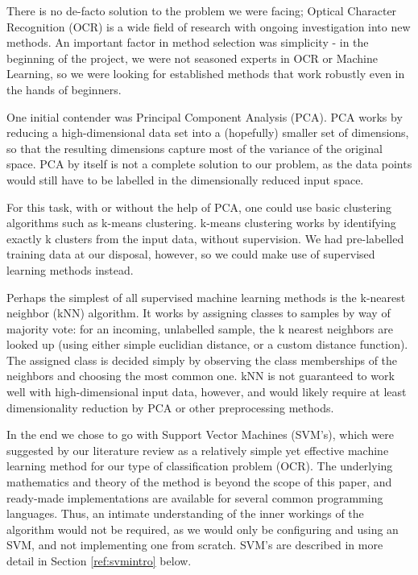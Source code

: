 \documentclass{netsec2012}
\begin{document}
There is no de-facto solution to the problem we were facing; Optical Character Recognition (OCR) is
a wide field of research with ongoing investigation into new methods.  An important factor in method
selection was simplicity - in the beginning of the project, we were not seasoned experts in OCR or
Machine Learning, so we were looking for established methods that work robustly even in the hands of
beginners.

One initial contender was Principal Component Analysis (PCA).  PCA works by reducing a
high-dimensional data set into a (hopefully) smaller set of dimensions, so that the resulting
dimensions capture most of the variance of the original space.  PCA by itself is not a complete
solution to our problem, as the data points would still have to be labelled in the dimensionally
reduced input space. \cite{ding2004k}

For this task, with or without the help of PCA, one could use basic clustering algorithms such as
k-means clustering.  k-means clustering works by identifying exactly k clusters from the input data,
without supervision.  We had pre-labelled training data at our disposal, however, so we could make
use of supervised learning methods instead. \cite{ding2004k}

\label{ref:knn}

Perhaps the simplest of all supervised machine learning methods is the k-nearest neighbor (kNN)
algorithm.  It works by assigning classes to samples by way of majority vote: for an incoming,
unlabelled sample, the k nearest neighbors are looked up (using either simple euclidian distance, or
a custom distance function).  The assigned class is decided simply by observing the class
memberships of the neighbors and choosing the most common one.  kNN is not guaranteed to work well
with high-dimensional input data, however, and would likely require at least dimensionality
reduction by PCA or other preprocessing methods. \cite{keller1985fuzzy}

In the end we chose to go with Support Vector Machines (SVM's), which were suggested by our
literature review as a relatively simple yet effective machine learning method for our type of
classification problem (OCR).  The underlying mathematics and theory of the method is beyond the
scope of this paper, and ready-made implementations are available for several common programming
languages.  Thus, an intimate understanding of the inner workings of the algorithm would not be
required, as we would only be configuring and using an SVM, and not implementing one from scratch.
SVM's are described in more detail in Section \ref{ref:svmintro} below. \cite{libsvm_guide}
\end{document}

